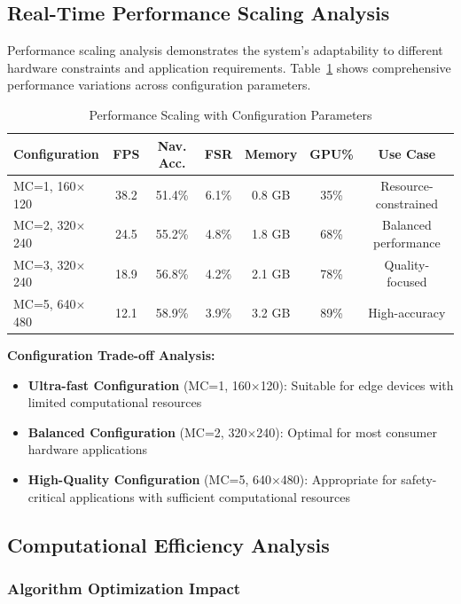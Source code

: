 \documentclass[10pt]{article}
\newcommand{\tabref}[1]{Table~\ref{#1}}
\begin{document}
\subsection{Real-Time Performance Scaling Analysis}

Performance scaling analysis demonstrates the system's adaptability to different hardware constraints and application requirements. \tabref{tab:performance_scaling_detailed} shows comprehensive performance variations across configuration parameters.

\begin{table}[ht]
\centering
\caption{Performance Scaling with Configuration Parameters}
\label{tab:performance_scaling_detailed}
\begin{tabular}{@{}lcccccc@{}}
\toprule
\textbf{Configuration} & \textbf{FPS} & \textbf{Nav. Acc.} & \textbf{FSR} & \textbf{Memory} & \textbf{GPU\%} & \textbf{Use Case} \\
\midrule
MC=1, 160$\times$120 & 38.2 & 51.4\% & 6.1\% & 0.8 GB & 35\% & Resource-constrained \\
MC=2, 320$\times$240 & 24.5 & 55.2\% & 4.8\% & 1.8 GB & 68\% & Balanced performance \\
MC=3, 320$\times$240 & 18.9 & 56.8\% & 4.2\% & 2.1 GB & 78\% & Quality-focused \\
MC=5, 640$\times$480 & 12.1 & 58.9\% & 3.9\% & 3.2 GB & 89\% & High-accuracy \\
\bottomrule
\end{tabular}
\end{table}

\textbf{Configuration Trade-off Analysis:}
\begin{itemize}
\item \textbf{Ultra-fast Configuration} (MC=1, 160$\times$120): Suitable for edge devices with limited computational resources
\item \textbf{Balanced Configuration} (MC=2, 320$\times$240): Optimal for most consumer hardware applications
\item \textbf{High-Quality Configuration} (MC=5, 640$\times$480): Appropriate for safety-critical applications with sufficient computational resources
\end{itemize}

\subsection{Computational Efficiency Analysis}

\subsubsection{Algorithm Optimization Impact}
\end{document}
